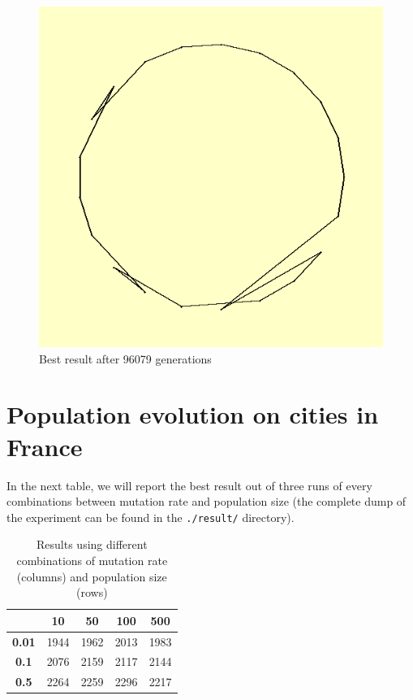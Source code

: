 \documentclass{article}
\begin{document}
\begin{figure}[!ht]
\includegraphics[width=\textwidth]{../result/exercise2/best.png}
\caption{Best result after 96079 generations}
\end{figure}
\newpage

\section{Population evolution on cities in France}
In the next table, we will report the best result out of three runs of every combinations between mutation rate and population size (the complete dump of the experiment can be found in the \texttt{./result/} directory).

\begin{table}
\centering
\caption{Results using different combinations of mutation rate (columns) and population size (rows)}
\begin{tabular}{c||c|c|c|c}
& \bf 10 &\bf 50 &\bf 100 & \bf 500\\
\hline
\bf 0.01 & 1944 & 1962 & 2013 & 1983\\
\hline
\bf 0.1 & 2076 & 2159 & 2117 & 2144\\
\hline
\bf 0.5 & 2264 & 2259 & 2296 & 2217\\
\end{tabular}
\end{table}
\end{document}

